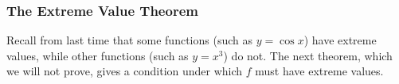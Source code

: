 \begin{frame}
\frametitle{The Extreme Value Theorem}
Recall from last time that some functions (such as $y = \cos x$) have extreme values, while other functions (such as $y = x^3$) do not.  The next theorem, which we will not prove, gives a condition under which $f$ must have extreme values.
\end{frame}
